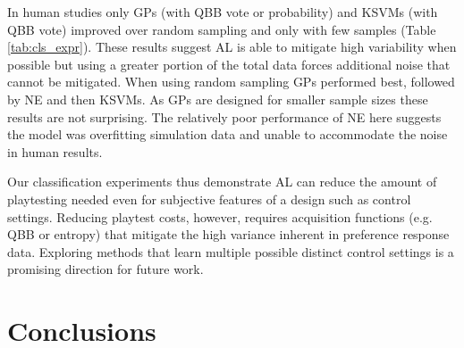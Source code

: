 \documentclass{sig-alternate}
\begin{document}
\begin{table}[tb]
\label{tab:cls_expr}
\end{table}

In human studies only GPs (with QBB vote or probability) and KSVMs (with QBB vote) improved over random sampling and only with few samples (Table \ref{tab:cls_expr}).
These results suggest AL is able to mitigate high variability when possible but using a greater portion of the total data forces additional noise that cannot be mitigated.
When using random sampling GPs performed best, followed by NE and then KSVMs.
As GPs are designed for smaller sample sizes these results are not surprising.
The relatively poor performance of NE here suggests the model was overfitting simulation data and unable to accommodate the noise in human results.


Our classification experiments thus demonstrate AL can reduce the amount of playtesting needed even for subjective features of a design such as control settings.
Reducing playtest costs, however, requires acquisition functions (e.g. QBB or entropy) that mitigate the high variance inherent in preference response data.
Exploring methods that learn multiple possible distinct control settings is a promising direction for future work.




\section{Conclusions}

\end{document}
